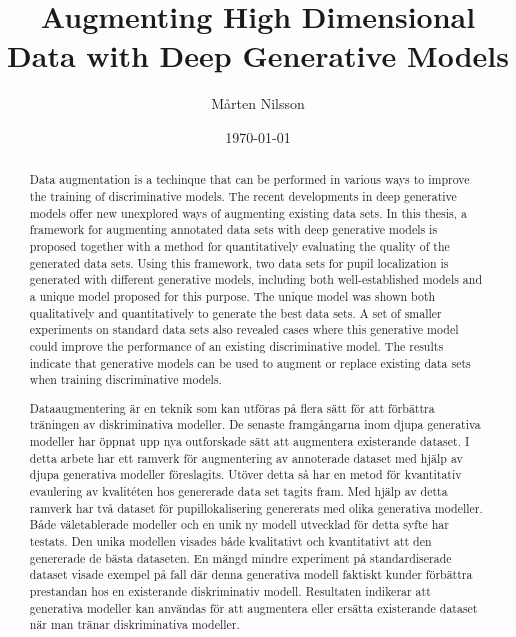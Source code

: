 \documentclass{kththesis}
\title{Augmenting High Dimensional Data with Deep Generative Models}
\author{Mårten Nilsson}
\date{\today}
\begin{document}
\frontmatter

\titlepage

\begin{abstract}
Data augmentation is a techinque that can be performed in various ways to improve the training of discriminative models. The recent developments in deep generative models offer new unexplored ways of augmenting existing data sets. In this thesis, a framework for augmenting annotated data sets with deep generative models is proposed together with a method for quantitatively evaluating the quality of the generated data sets. Using this framework, two data sets for pupil localization is generated with different generative models, including both well-established models and a unique model proposed for this purpose. The unique model was shown both qualitatively and quantitatively to generate the best data sets. A set of smaller experiments on standard data sets also revealed cases where this generative model could improve the performance of an existing discriminative model. The results indicate that generative models can be used to augment or replace existing data sets when training discriminative models.
\end{abstract}


\begin{otherlanguage}{swedish}
  \begin{abstract}
      Dataaugmentering är en teknik som kan utföras på flera sätt för att förbättra träningen av diskriminativa modeller. De senaste framgångarna inom djupa generativa modeller har öppnat upp nya outforskade sätt att augmentera existerande dataset. I detta arbete har ett ramverk för augmentering av annoterade dataset med hjälp av djupa generativa modeller föreslagits. Utöver detta så har en metod för kvantitativ evaulering av kvalitéten hos genererade data set tagits fram. Med hjälp av detta ramverk har två dataset för pupillokalisering genererats med olika generativa modeller. Både väletablerade modeller och en unik ny modell utvecklad för detta syfte har testats. Den unika modellen visades både kvalitativt och kvantitativt att den genererade de bästa dataseten. En mängd mindre experiment på standardiserade dataset visade exempel på fall där denna generativa modell faktiskt kunder förbättra prestandan hos en existerande diskriminativ modell. Resultaten indikerar att generativa modeller kan användas för att augmentera eller ersätta existerande dataset när man tränar diskriminativa modeller.
  \end{abstract}
\end{otherlanguage}
\end{document}
